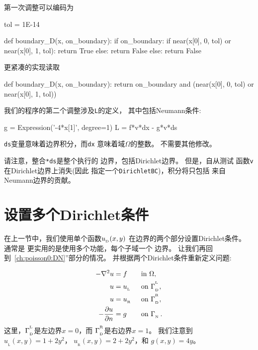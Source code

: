 \noindent
第一次调整可以编码为

\begin{python}
tol = 1E-14

def boundary_D(x, on_boundary):
    if on_boundary:
        if near(x[0], 0, tol) or near(x[0], 1, tol):
            return True
        else:
            return False
    else:
        return False
\end{python}
更紧凑的实现读取

\begin{python}
def boundary_D(x, on_boundary):
    return on_boundary and (near(x[0], 0, tol) or near(x[0], 1, tol))
\end{python}


我们的程序的第二个调整涉及\texttt{L}的定义，
其中包括Neumann条件:

\begin{python}
g = Expression('-4*x[1]', degree=1)
L = f*v*dx - g*v*ds
\end{python}
\texttt{ds}变量意味着边界积分，而\texttt{dx}
意味着域$\Omega$的整数。
不需要其他修改。

请注意，整合\texttt{*ds}是整个执行的
边界，包括Dirichlet边界。 但是，自从测试
函数\texttt{v}在Dirichlet边界上消失(因此
指定一个\texttt{DirichletBC})，积分将只包括
来自Neumann边界的贡献。

\section{设置多个Dirichlet条件}
\label{ch:poisson0:multiple:Dirichlet}

在上一节中，我们使用单个函数$u_{_\mathrm{D}}(x,y)$
在边界的两个部分设置Dirichlet条件。 通常是
更实用的是使用多个功能，每个子域一个
边界。 让我们再回到~\ref{ch:poisson0:DN}”部分的情况。
并根据两个Dirichlet条件重新定义问题:

\begin{alignat*}{2}
    - \nabla^2 u &= f \quad&&\mbox{in } \Omega, \\
    u &= u_{_\mathrm{L}} &&\mbox{on } \Gamma_{_\mathrm{D}}^{^{\mathrm{L}}}, \\
    u &= u_{_\mathrm{R}} &&\mbox{on } \Gamma_{_\mathrm{D}}^{^{\mathrm{R}}}, \\
    - {\partial u\over\partial n} &= g &&\mbox{on } \Gamma_{_\mathrm{N}} \thinspace .
\end{alignat*}
这里，$\Gamma_{_\mathrm{D}}^{^{\mathrm{L}}}$是左边界$x=0$，而
$\Gamma_{_\mathrm{D}}^{^{\mathrm{R}}}$是右边界$x=1$。 我们注意到
$u_{_\mathrm{L}}(x, y) = 1 + 2y^2$，
$u_{_\mathrm{R}}(x, y) = 2 + 2y^2$，和
$g(x, y)=4y$。

